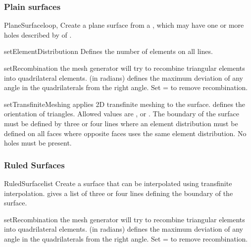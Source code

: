 \subsubsection{Plain surfaces}
\begin{classdesc}{PlaneSurface}{loop, }
Create a plane surface from a , which may have one or more holes
described by  of .
\end{classdesc}
\begin{methoddesc}[PlaneSurface]{setElementDistribution}{n}
Defines the number of elements on all lines.
\end{methoddesc}

\begin{methoddesc}[PlaneSurface]{setRecombination}{}
the mesh generator will try to recombine triangular elements 
into quadrilateral elements.  (in radians) defines the
maximum deviation of any angle in the quadrilaterals from the right angle.  
Set = to remove recombination.
\end{methoddesc}
\begin{methoddesc}[PlaneSurface]{setTransfiniteMeshing}{}
applies 2D transfinite meshing to the surface. 
 defines the orientation of triangles. Allowed values
are ,  or . The 
boundary of the surface must be defined by three or four lines where an
element distribution must be defined on all faces where opposite 
faces uses the same element distribution. No holes must be present.
\end{methoddesc}



\subsubsection{Ruled Surfaces}
\begin{classdesc}{RuledSurface}{list}
Create a surface that can be interpolated using transfinite interpolation.
 gives a list of three or four lines defining the boundary of the
surface.
\end{classdesc}

\begin{methoddesc}[RuledSurface]{setRecombination}{}
the mesh generator will try to recombine triangular elements 
into quadrilateral elements.  (in radians) defines the
maximum deviation of any angle in the quadrilaterals from the right angle.  
Set = to remove recombination.
\end{methoddesc}

